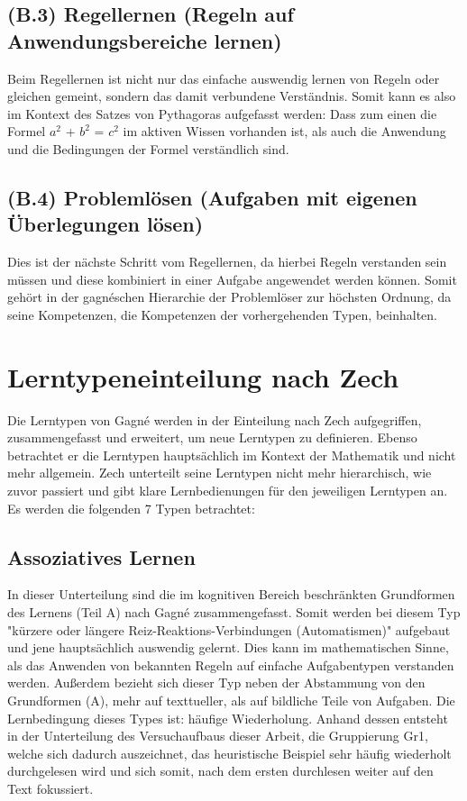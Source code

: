 \subsection[]{(B.3) Regellernen (Regeln auf Anwendungsbereiche lernen)}

Beim Regellernen ist nicht nur das einfache auswendig lernen von Regeln oder gleichen gemeint, sondern das damit verbundene Verständnis. Somit kann es also im Kontext des Satzes von Pythagoras aufgefasst werden: Dass zum einen die Formel $a^2$ + $b^2$ = $c^2$ im aktiven Wissen vorhanden ist, als auch die Anwendung und die Bedingungen der Formel verständlich sind\cite{zech1983grundkurs}.

\subsection[]{(B.4) Problemlösen (Aufgaben mit eigenen Überlegungen lösen)}

Dies ist der nächste Schritt vom Regellernen, da hierbei Regeln verstanden sein müssen und diese kombiniert in einer Aufgabe angewendet werden können. Somit gehört in der gagnéschen Hierarchie der Problemlöser zur höchsten Ordnung, da seine Kompetenzen, die Kompetenzen der vorhergehenden Typen, beinhalten\cite{zech1983grundkurs}.

\section{Lerntypeneinteilung nach Zech}

Die Lerntypen von Gagné werden in der Einteilung nach Zech aufgegriffen, zusammengefasst und erweitert, um neue Lerntypen zu definieren. Ebenso betrachtet er die Lerntypen hauptsächlich im Kontext der Mathematik und nicht mehr allgemein. Zech unterteilt seine Lerntypen nicht mehr hierarchisch, wie zuvor passiert und gibt klare Lernbedienungen für den jeweiligen Lerntypen an. Es werden die folgenden 7 Typen betrachtet:

\subsection[]{Assoziatives Lernen}

In dieser Unterteilung sind die im kognitiven Bereich beschränkten Grundformen des Lernens (Teil A) nach Gagné zusammengefasst. Somit werden bei diesem Typ "kürzere oder längere Reiz-Reaktions-Verbindungen (Automatismen)" aufgebaut und jene hauptsächlich auswendig gelernt. Dies kann im mathematischen Sinne, als das Anwenden von bekannten Regeln auf einfache Aufgabentypen verstanden werden. Außerdem bezieht sich dieser Typ neben der Abstammung von den Grundformen (A), mehr auf texttueller, als auf bildliche Teile von Aufgaben.
Die Lernbedingung dieses Types ist: häufige Wiederholung. 
Anhand dessen entsteht in der Unterteilung des Versuchaufbaus dieser Arbeit, die Gruppierung \gls{Gr1}, welche sich dadurch auszeichnet, das heuristische Beispiel sehr häufig wiederholt durchgelesen wird und sich somit, nach dem ersten durchlesen weiter auf den Text fokussiert\cite{zech1983grundkurs}. 


